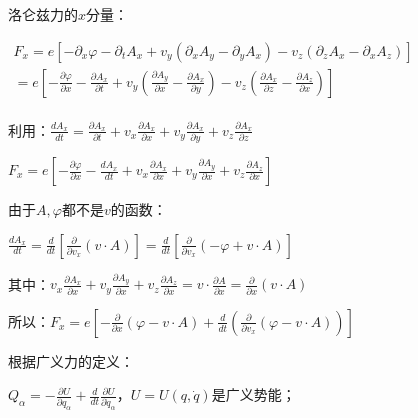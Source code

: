 洛仑兹力的$x$分量：

$\begin{array}{l}
 F_x  = e\left[ { - \partial _x \varphi  - \partial _t A_x  + v_y \left( {\partial _x A_y  - \partial _y A_x } \right) - v_z \left( {\partial _z A_x  - \partial _x A_z } \right)} \right] \\
  = e\left[ { - \frac{{\partial \varphi }}{{\partial x}} - \frac{{\partial A_x }}{{\partial t}} + v_y \left( {\frac{{\partial A_y }}{{\partial x}} - \frac{{\partial A_x }}{{\partial y}}} \right) - v_z \left( {\frac{{\partial A_x }}{{\partial z}} - \frac{{\partial A_z }}{{\partial x}}} \right)} \right] \\
 \end{array}$

利用：$\frac{{dA_x }}{{dt}} = \frac{{\partial A_x }}{{\partial t}} + v_x \frac{{\partial A_x }}{{\partial x}} + v_y \frac{{\partial A_x }}{{\partial y}} + v_z \frac{{\partial A_x }}{{\partial z}}$

\begin{center}
$F_x  = e\left[ { - \frac{{\partial \varphi }}{{\partial x}} - \frac{{dA_x }}{{dt}} + v_x \frac{{\partial A_x }}{{\partial x}} + v_y \frac{{\partial A_y }}{{\partial x}} + v_z \frac{{\partial A_z }}{{\partial x}}} \right]$
\end{center}

由于$A,\varphi $都不是$v$的函数：

\begin{center}
$\frac{{dA_x }}{{dt}} = \frac{d}{{dt}}\left[ {\frac{\partial }{{\partial v_x }}\left( {v \cdot A} \right)} \right] = \frac{d}{{dt}}\left[ {\frac{\partial }{{\partial v_x }}\left( { - \varphi  + v \cdot A} \right)} \right]$
\end{center}

其中：$v_x \frac{{\partial A_x }}{{\partial x}} + v_y \frac{{\partial A_y }}{{\partial x}} + v_z \frac{{\partial A_z }}{{\partial x}} = v \cdot \frac{{\partial A}}{{\partial x}} = \frac{\partial }{{\partial x}}\left( {v \cdot A} \right)$

所以：$F_x  = e\left[ { - \frac{\partial }{{\partial x}}\left( {\varphi  - v \cdot A} \right) + \frac{d}{{dt}}\left( {\frac{\partial }{{\partial v_x }}\left( {\varphi  - v \cdot A} \right)} \right)} \right]$

根据广义力的定义：

\begin{center}
$Q_\alpha   =  - \frac{{\partial U}}{{\partial q_\alpha  }} + \frac{d}{{dt}}\frac{{\partial U}}{{\partial \dot q_\alpha  }}$，$U = U\left( {q,\dot q} \right)$是广义势能；
\end{center}


